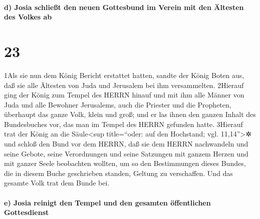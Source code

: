 \hypertarget{d-josia-schlieuxdft-den-neuen-gottesbund-im-verein-mit-den-uxe4ltesten-des-volkes-ab}{%
\paragraph{d) Josia schließt den neuen Gottesbund im Verein mit den
Ältesten des Volkes
ab}\label{d-josia-schlieuxdft-den-neuen-gottesbund-im-verein-mit-den-uxe4ltesten-des-volkes-ab}}

\hypertarget{section-22}{%
\section{23}\label{section-22}}

1Als sie nun dem König Bericht erstattet hatten, sandte der König Boten
aus, daß sie alle Ältesten von Juda und Jerusalem bei ihm versammelten.
2Hierauf ging der König zum Tempel des HERRN hinauf und mit ihm alle
Männer von Juda und alle Bewohner Jerusalems, auch die Priester und die
Propheten, überhaupt das ganze Volk, klein und groß; und er las ihnen
den ganzen Inhalt des Bundesbuches vor, das man im Tempel des HERRN
gefunden hatte. 3Hierauf trat der König an die Säule\textless sup
title=``oder: auf den Hochstand; vgl. 11,14''\textgreater✲ und schloß
den Bund vor dem HERRN, daß sie dem HERRN nachwandeln und seine Gebote,
seine Verordnungen und seine Satzungen mit ganzem Herzen und mit ganzer
Seele beobachten wollten, um so den Bestimmungen dieses Bundes, die in
diesem Buche geschrieben standen, Geltung zu verschaffen. Und das
gesamte Volk trat dem Bunde bei.

\hypertarget{e-josia-reinigt-den-tempel-und-den-gesamten-uxf6ffentlichen-gottesdienst}{%
\paragraph{e) Josia reinigt den Tempel und den gesamten öffentlichen
Gottesdienst}\label{e-josia-reinigt-den-tempel-und-den-gesamten-uxf6ffentlichen-gottesdienst}}


